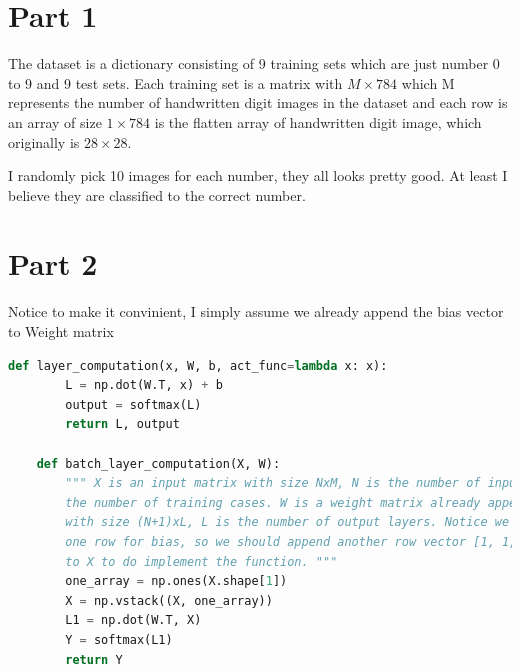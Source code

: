 \documentclass[12pt]{article}
\begin{document}
\section{Part 1}
The dataset is a dictionary consisting of 9 training sets which are just number 0 to 9 and 9 test sets. Each training set is a matrix with $M\times 784$ which M represents the number of handwritten digit images in the dataset and each row is an array of size $1\times 784$ is the flatten array of handwritten digit image, which originally is $28\times 28$.

I randomly pick 10 images for each number, they all looks pretty good. At least I believe they are classified to the correct number.

\section{Part 2}
Notice to make it convinient, I simply assume we already append the bias vector to Weight matrix
\begin{lstlisting}[language=Python]
    def layer_computation(x, W, b, act_func=lambda x: x):
        L = np.dot(W.T, x) + b
      	output = softmax(L)
      	return L, output

    def batch_layer_computation(X, W):
        """ X is an input matrix with size NxM, N is the number of input units, M is
        the number of training cases. W is a weight matrix already append bias vector 
        with size (N+1)xL, L is the number of output layers. Notice we need extra 
        one row for bias, so we should append another row vector [1, 1, 1, 1, ... ,1] 
        to X to do implement the function. """
        one_array = np.ones(X.shape[1])
        X = np.vstack((X, one_array))
        L1 = np.dot(W.T, X)
        Y = softmax(L1)
        return Y
\end{lstlisting}
\end{document}

